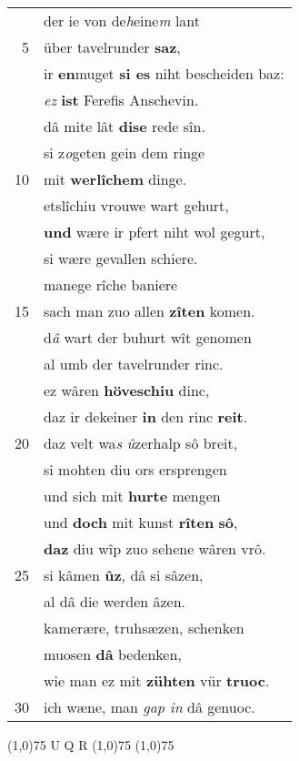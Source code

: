 \documentclass[8pt,a4paper,notitlepage]{article}
\begin{document}
\begin{table}[ht]
\begin{minipage}[t]{0.5\linewidth}
\begin{tabular}{rl}
 & der ie von de\textit{h}eine\textit{m} lant\\ 
5 & über tavelrunder \textbf{saz},\\ 
 & ir \textbf{en}muget \textbf{si es} niht bescheiden baz:\\ 
 & \textit{ez} \textbf{ist} Ferefis Anschevin.\\ 
 & dâ mite lât \textbf{dise} rede sîn.\\ 
 & si z\textit{o}geten gein dem ringe\\ 
10 & mit \textbf{werlîchem} dinge.\\ 
 & etslîchiu vrouwe wart gehurt,\\ 
 & \textbf{und} wære ir pfert niht wol gegurt,\\ 
 & si wære gevallen schiere.\\ 
 & manege rîche baniere\\ 
15 & sach man zuo allen \textbf{zîten} komen.\\ 
 & d\textit{â} wart der buhurt wît genomen\\ 
 & al umb der tavelrunder rinc.\\ 
 & ez wâren \textbf{höveschiu} dinc,\\ 
 & daz ir dekeiner \textbf{in} den rinc \textbf{reit}.\\ 
20 & daz velt wa\textit{s} \textit{û}zerhalp sô breit,\\ 
 & si mohten diu ors ersprengen\\ 
 & und sich mit \textbf{hurte} mengen\\ 
 & und \textbf{doch} mit kunst \textbf{rîten} \textbf{sô},\\ 
 & \textbf{daz} diu wîp zuo sehene wâren vrô.\\ 
25 & si kâmen \textbf{ûz}, dâ si sâzen,\\ 
 & al dâ die werden âzen.\\ 
 & kamerære, truhsæzen, schenken\\ 
 & muosen \textbf{dâ} bedenken,\\ 
 & wie man ez mit \textbf{zühten} vür \textbf{truoc}.\\ 
30 & ich wæne, man \textit{gap in} dâ genuoc.\\ 
\end{tabular}
\scriptsize
\line(1,0){75} \newline
U Q R \newline
\line(1,0){75} \newline
\newline
\line(1,0){75} \newline

\end{minipage}
\end{table}
\end{document}
